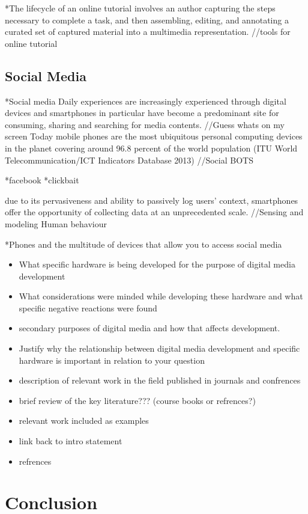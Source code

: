 \documentclass[12pt, times new roman]{article}
\begin{document}
	*The lifecycle of an online tutorial involves an author capturing the  
steps necessary to complete a task, and then assembling, editing, and annotating a
curated set of captured material into a multimedia representation.    //tools for online tutorial
\newline
\subsection{Social Media}
*Social media
	Daily experiences are increasingly experienced through digital devices and smartphones in particular have become
a predominant site for consuming, sharing and searching for media contents. //Guess whats on my screen
	 Today mobile phones are the most ubiquitous personal computing devices in the planet covering around 96.8 percent  of the world population (ITU World Telecommunication/ICT Indicators Database 2013)  //Social BOTS

		*facebook
	*clickbait 


	due to its pervasiveness and ability to passively log
	users’ context, smartphones offer the opportunity of collecting data at an unprecedented scale. //Sensing and modeling Human behaviour 

		*Phones and the multitude of devices that allow you to access social media 
\begin{itemize}
	\item What specific hardware is being developed for the purpose of digital media development 
	\item What considerations were minded while developing these hardware and what specific negative reactions were found 
	\item secondary purposes of digital media and how that affects development.
	\item Justify why the relationship between digital media development and specific hardware is important in relation to your question
	\item description of relevant work in the field published in journals and confrences
	\item brief review of the key literature??? (course books or refrences?)  
	\item relevant work included as examples 
	\item link back to intro statement  
	\item refrences 
\end{itemize}
\section{Conclusion}
\end{document}
